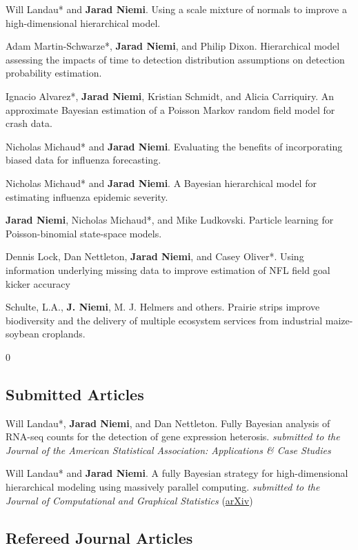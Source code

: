 \documentclass[overlapped,line]{res}
\providecommand{\includesubmitted}{0}
\begin{document}
\begin{resume}
Will Landau* and {\bf Jarad Niemi}. Using a scale mixture of normals to improve a high-dimensional hierarchical model.

Adam Martin-Schwarze*, {\bf Jarad Niemi}, and Philip Dixon. Hierarchical model assessing the impacts of time to detection distribution assumptions on detection probability estimation.

Ignacio Alvarez*, {\bf Jarad Niemi}, Kristian Schmidt, and Alicia Carriquiry. An approximate Bayesian estimation of a Poisson Markov random field model for crash data.


Nicholas Michaud* and {\bf Jarad Niemi}. Evaluating the benefits of incorporating biased data for influenza forecasting.

Nicholas Michaud* and {\bf Jarad Niemi}. A Bayesian hierarchical model for estimating influenza epidemic severity.

{\bf Jarad Niemi}, Nicholas Michaud*, and Mike Ludkovski. Particle learning for Poisson-binomial state-space models.

Dennis Lock, Dan Nettleton, {\bf Jarad Niemi}, and Casey Oliver*. Using information underlying missing data to improve estimation of NFL field goal kicker accuracy

Schulte, L.A., {\bf J. Niemi}, M. J. Helmers and others. Prairie strips improve biodiversity and the delivery of multiple ecosystem services from industrial maize-soybean croplands.

\fi


\includesubmitted
\subsection{\bf Submitted Articles} \vspace{-0.2in}

Will Landau*, {\bf Jarad Niemi}, and Dan Nettleton. Fully Bayesian analysis of RNA-seq counts for the detection of gene expression heterosis. \emph{submitted to the Journal of the American Statistical Association: Applications \& Case Studies}

Will Landau* and {\bf Jarad Niemi}. A fully Bayesian strategy for high-dimensional hierarchical modeling using massively parallel computing.  \emph{submitted to the Journal of Computational and Graphical Statistics} (\href{https://arxiv.org/abs/1606.06659}{arXiv})
\fi

\subsection{\bf Refereed Journal Articles} \vspace{-0.2in}


\end{resume}
\end{document}
